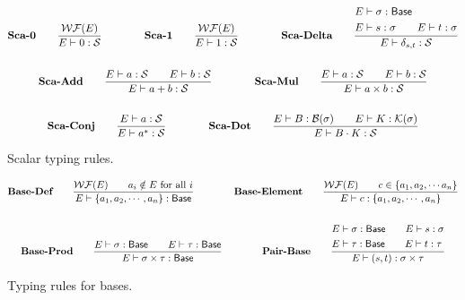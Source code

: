 \documentclass{article}
\begin{document}
\begin{figure}[h]
    \begin{gather*}
        \textbf{Sca-0} \qquad
        \frac{\mathcal{WF}(E)}{E \vdash 0 : \mathcal{S}}
        \qquad \qquad
        \textbf{Sca-1} \qquad
        \frac{\mathcal{WF}(E)}{E \vdash 1 : \mathcal{S}}
        \qquad \qquad
        \textbf{Sca-Delta} \qquad
        \frac{            
            \begin{aligned}
                & E\vdash \sigma : \mathsf{Base} \\
                & E\vdash s : \sigma \qquad E\vdash t : \sigma
            \end{aligned}} {E \vdash \delta_{s, t} : \mathcal{S}} \\
        \\
        \textbf{Sca-Add} \qquad
        \frac{E\vdash a : \mathcal{S} \qquad E\vdash b : \mathcal{S}}{E\vdash a + b : \mathcal{S}}
        \qquad \qquad
        \textbf{Sca-Mul} \qquad
        \frac{E\vdash a : \mathcal{S} \qquad E\vdash b : \mathcal{S}}{E\vdash a \times b : \mathcal{S}} \\
        \\
        \textbf{Sca-Conj} \qquad
        \frac{E \vdash a : \mathcal{S}}{E \vdash a^*:\mathcal{S}}
        \qquad \qquad
        \textbf{Sca-Dot} \qquad
        \frac{E\vdash B : \mathcal{B}(\sigma) \qquad E\vdash K : \mathcal{K}(\sigma)}{E \vdash B \cdot K : \mathcal{S}}
    \end{gather*}
    \caption{Scalar typing rules.}
\end{figure}

\begin{figure}[h]
    \begin{gather*}
        \textbf{Base-Def} \qquad
        \frac{\mathcal{WF}(E) \qquad a_i \notin E \text{ for all $i$}}
        {E\vdash \{a_1, a_2, \cdots, a_n\} : \mathsf{Base}}
        \qquad \qquad
        \textbf{Base-Element} \qquad
        \frac{\mathcal{WF}(E) \qquad c \in \{a_1, a_2, \cdots a_n\}}{E\vdash c : \{a_1, a_2, \cdots, a_n\}} \\
        \\
        \textbf{Base-Prod} \qquad
        \frac{E\vdash \sigma : \mathsf{Base} \qquad E\vdash \tau : \mathsf{Base}}{E\vdash \sigma \times \tau : \mathsf{Base}}
        \qquad \qquad
        \textbf{Pair-Base} \qquad
        \frac{
            \begin{aligned}
                & E\vdash \sigma : \mathsf{Base} \qquad E\vdash s : \sigma \\
                & E\vdash \tau : \mathsf{Base} \qquad E\vdash t : \tau
            \end{aligned}} {E\vdash (s, t) : \sigma \times \tau} 
        \textbf{}
    \end{gather*}
    \caption{Typing rules for bases. }
\end{figure}
\end{document}
